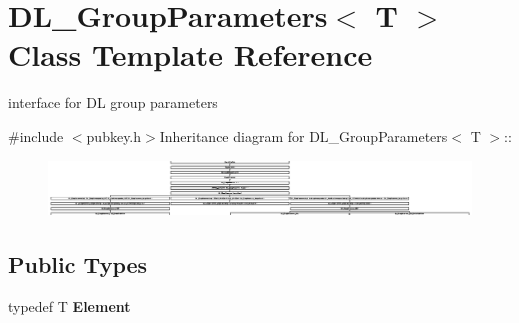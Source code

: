 \hypertarget{class_d_l___group_parameters}{
\section{DL\_\-GroupParameters$<$ T $>$ Class Template Reference}
\label{class_d_l___group_parameters}
}


interface for DL group parameters  


{\ttfamily \#include $<$pubkey.h$>$}Inheritance diagram for DL\_\-GroupParameters$<$ T $>$::\begin{figure}[H]
\begin{center}
\leavevmode
\includegraphics[height=1.47228cm]{class_d_l___group_parameters}
\end{center}
\end{figure}
\subsection*{Public Types}
\begin{DoxyCompactItemize}
\item 
\hypertarget{class_d_l___group_parameters_a571dc0fc769ed7fa2037f70681cb94c7}{
typedef T {\bfseries Element}}
\label{class_d_l___group_parameters_a571dc0fc769ed7fa2037f70681cb94c7}

\end{DoxyCompactItemize}
